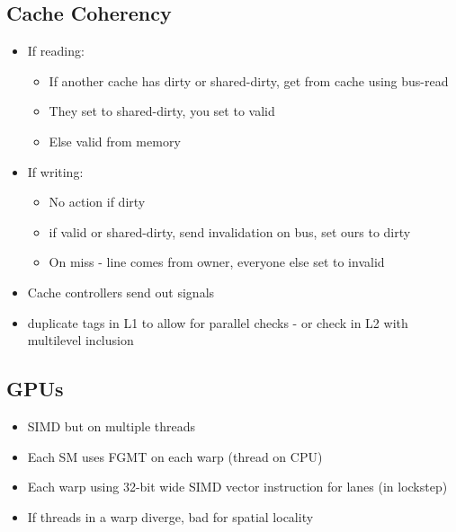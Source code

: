 \documentclass[a4paper, 5pt, twocolumn]{article}
\begin{document}
\hypertarget{cache-coherency}{%
\subsection{Cache Coherency}\label{cache-coherency}}

\begin{itemize}[topsep=0pt,itemsep=-1ex,partopsep=1ex,parsep=1ex]
\item
  If reading:

  \begin{itemize}[topsep=0pt,itemsep=-1ex,partopsep=1ex,parsep=1ex]
  \item
    If another cache has dirty or shared-dirty, get from cache using
    bus-read
  \item
    They set to shared-dirty, you set to valid
  \item
    Else valid from memory
  \end{itemize}
\item
  If writing:

  \begin{itemize}[topsep=0pt,itemsep=-1ex,partopsep=1ex,parsep=1ex]
  \item
    No action if dirty
  \item
    if valid or shared-dirty, send invalidation on bus, set ours to
    dirty
  \item
    On miss - line comes from owner, everyone else set to invalid
  \end{itemize}
\item
  Cache controllers send out signals
\item
  duplicate tags in L1 to allow for parallel checks - or check in L2
  with multilevel inclusion
\end{itemize}

\hypertarget{gpus}{%
\subsection{GPUs}\label{gpus}}

\begin{itemize}[topsep=0pt,itemsep=-1ex,partopsep=1ex,parsep=1ex]
\item
  SIMD but on multiple threads
\item
  Each SM uses FGMT on each warp (thread on CPU)
\item
  Each warp using 32-bit wide SIMD vector instruction for lanes (in
  lockstep)
\item
  If threads in a warp diverge, bad for spatial locality
\end{itemize}
\end{document}
